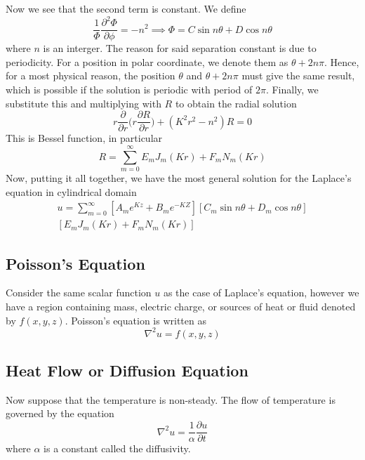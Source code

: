 \documentclass[../main.tex]{subfiles}
\begin{document}
Now we see that the second term is constant. We define 
\begin{equation*}
    \frac{1}{\Phi}\frac{\partial^2 \Phi}{\partial \phi}=-n^2\implies \Phi=C\sin n\theta +D\cos n\theta
\end{equation*}
where $n$ is an interger. The reason for said separation constant is due to periodicity. For a position in polar coordinate, we denote them as $\theta+2n\pi$. Hence, for a most physical reason, the position $\theta$ and $\theta+2n\pi$ must give the same result, which is possible if the solution is periodic with period of $2\pi$. Finally, we substitute this and multiplying with $R$ to obtain the radial solution
\begin{equation*}
    r\frac{\partial}{\partial r}\Biggl(r\frac{\partial R}{\partial r}\Biggr)
    +(K^2r^2-n^2)R=0
\end{equation*}
This is Bessel function, in particular
\begin{equation*}
    R=\sum_{m=0}^{\infty}E_mJ_m(Kr)+F_mN_m(Kr)
\end{equation*}
Now, putting it all together, we have the most general solution for the Laplace's equation in cylindrical domain 
\begin{multline*}
    u=\sum_{m=0}^{\infty}\left[A_me^{Kz}+B_me^{-KZ}\right]\left[C_m\sin n\theta +D_m\cos n\theta\right]\\
    \left[E_mJ_m(Kr)+F_mN_m(Kr)\right]
\end{multline*}

\subsection*{Poisson’s Equation}
Consider the same scalar function $u$ as the case of Laplace's equation, however we have a region containing mass, electric charge, or sources of heat or fluid denoted by $f(x,y,z)$. Poisson's equation is written as 
\begin{equation*}
    \nabla^2 u=f(x,y,z)
\end{equation*}

\subsection*{Heat Flow or Diffusion Equation}
Now suppose that the temperature is non-steady. The flow of temperature is governed by the equation 
\begin{equation*}
    \nabla^2 u=\frac{1}{\alpha}\frac{\partial u}{\partial t}
\end{equation*}
where $\alpha$ is a constant called the diﬀusivity.
\end{document}

